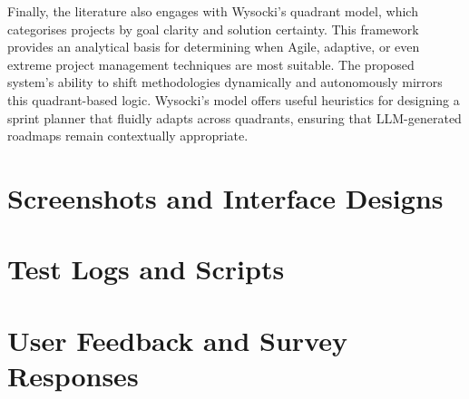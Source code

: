 \documentclass{report}
\begin{document}
Finally, the literature also engages with Wysocki’s quadrant model, which categorises projects by goal clarity and solution certainty. This framework provides an analytical basis for determining when Agile, adaptive, or even extreme project management techniques are most suitable. The proposed system's ability to shift methodologies dynamically and autonomously mirrors this quadrant-based logic. Wysocki’s model offers useful heuristics for designing a sprint planner that fluidly adapts across quadrants, ensuring that LLM-generated roadmaps remain contextually appropriate.

\chapter{Screenshots and Interface Designs}
\chapter{Test Logs and Scripts}
\chapter{User Feedback and Survey Responses}
\end{document}
